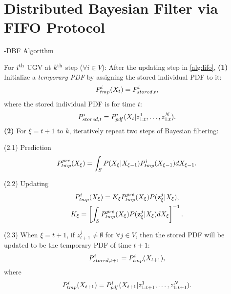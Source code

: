 \section{Distributed Bayesian Filter via FIFO Protocol}\label{sec:\proto-dbf}
	
		\begin{algorithm}
			\caption{\proto-DBF Algorithm}\label{alg:lifo-dbf}
			\begin{algorithmic}
				\State For $i^\text{th}$ UGV at $k^\text{th}$ step ($\forall i\in V$):
				\State After the updating step in \cref{alg:lifo},
				\State\textbf{(1)} Initialize a \textit{temporary PDF} by assigning the stored individual PDF to it:
				\small\begin{equation*}
				P^i_{tmp}(X_{t})= P^i_{stored,t},
				\end{equation*}\normalsize		
				where the stored individual PDF is for time $t$:
				\small\begin{equation*}
				P^i_{stored,t} = P^i_{pdf}(X_{t}|z^1_{1:t},\dots,z^N_{1:t}).
				\end{equation*}\normalsize	
				\State\textbf{(2)} For $\xi=t+1$ to $k$, iteratively repeat two steps of Bayesian filtering:
				
				\State(2.1) Prediction 
				\small\begin{equation*}
				P_{tmp}^{pre}(X_{\xi})=\int_{S} P(X_{\xi}|X_{\xi-1})P^i_{tmp}(X_{\xi-1})dX_{\xi-1}.
				\end{equation*} \normalsize
				
				\State(2.2) Updating
				\small\begin{gather*}
				P^i_{tmp}(X_{\xi})=K_{\xi} P_{tmp}^{pre}(X_{\xi})P(\mathbf{z}^j_{\xi}|X_{\xi}),\\
				K_{\xi}=\left[\int_S P_{tmp}^{pre}(X_{\xi})P(\mathbf{z}^j_{\xi}|X_{\xi})dX_{\xi}\right]^{-1}.
				\end{gather*} \normalsize
				
				\State(2.3) When $\xi=t+1$, if $z^j_{t+1}\neq\emptyset$ for $\forall j\in V$, then the stored PDF will be updated to be the temporary PDF of time $t+1$:
				\small\begin{equation*}
				P^i_{stored,t+1}=P^i_{tmp}(X_{t+1}),
				\end{equation*}\normalsize
				where 
				\small\begin{equation*}
				P^i_{tmp}(X_{t+1})=P^i_{pdf}(X_{t+1}|z^1_{1:t+1},\dots,z^N_{1:t+1}).
				\end{equation*}\normalsize
				

\end{algorithmic}
\end{algorithm}
